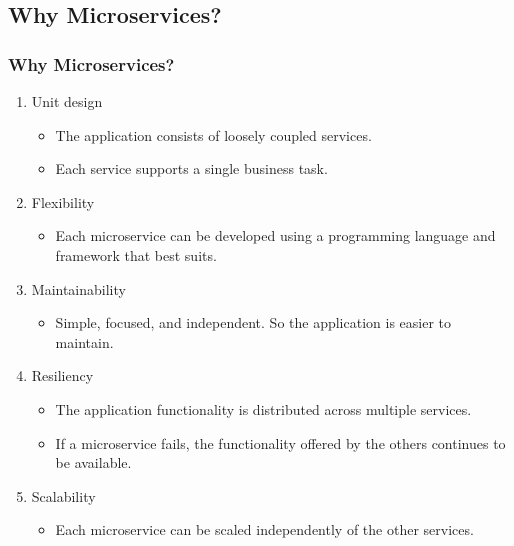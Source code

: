\documentclass{beamer}
\begin{document}
	\subsection	{Why Microservices?}
		\begin{frame}
			\frametitle{Why Microservices?}
				\begin{enumerate}
					\item<1-> Unit design
						\begin{itemize}
							\item \scriptsize {The application consists of loosely coupled services}. 
							\item \scriptsize {Each service supports a single business task}.
						\end{itemize}
					\item<2-> Flexibility
						\begin{itemize}
							\item \scriptsize {Each microservice can be developed using a programming language and framework that best suits}.
						\end{itemize}
					\item<3-> Maintainability
						\begin{itemize}
							\item \scriptsize {Simple, focused, and independent. So the application is easier to maintain}.
						\end{itemize}
					\item<4-> Resiliency
						\begin{itemize}
							\item \scriptsize {The application functionality is distributed across multiple services}. 
							\item \scriptsize {If a microservice fails, the functionality offered by the others continues to be available}.
						\end{itemize}
					\item<5-> Scalability
						\begin{itemize}
							\item \scriptsize {Each microservice can be scaled independently of the other services}.
						\end{itemize}
				\end{enumerate}
		\end{frame}
\end{document}

